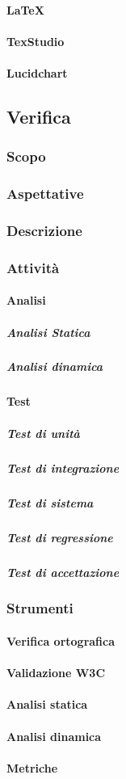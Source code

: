 		\paragraph{\LaTeX}
		\paragraph{TexStudio}
		\paragraph{Lucidchart}
	
\subsection{Verifica}

	\subsubsection{Scopo}
	\subsubsection{Aspettative}
	\subsubsection{Descrizione}
	\subsubsection{Attività}
		\paragraph{Analisi}
			\subparagraph{Analisi Statica}
			\subparagraph{Analisi dinamica}
		\paragraph{Test}
			\subparagraph{Test di unità}
			\subparagraph{Test di integrazione}
			\subparagraph{Test di sistema}
			\subparagraph{Test di regressione}					
			\subparagraph{Test di accettazione}
	\subsubsection{Strumenti}
			\paragraph{Verifica ortografica}
			\paragraph{Validazione W3C}
			\paragraph{Analisi statica}
			\paragraph{Analisi dinamica}
			\paragraph{Metriche}
			